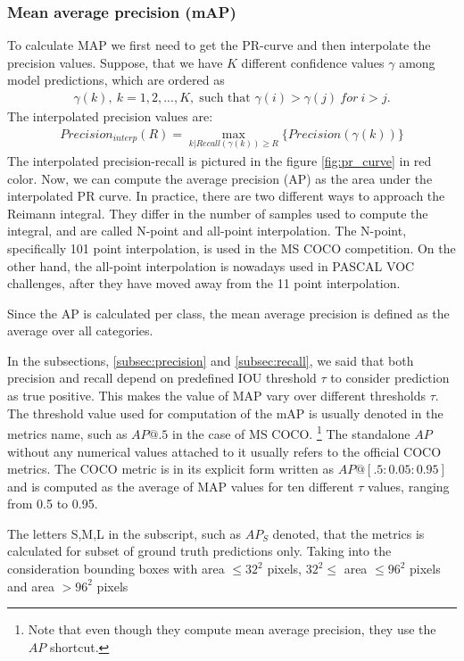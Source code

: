 \subsubsection{Mean average precision (mAP)}
To calculate MAP we first need to get the PR-curve and then interpolate the precision values. Suppose, that we have $K$ different confidence values $\gamma$ among model predictions, which are ordered as
\begin{align}
    \gamma(k),\: k = 1,2,...,K,  \; \text{such that } \gamma(i) > \gamma(j) \: for \: i > j.
\end{align}
The interpolated precision values are:
\begin{align}
    Precision_{interp}(R) = \max_{k|Recall(\gamma(k)) \geq R} \{  Precision(\gamma(k)) \}
\end{align}
The interpolated precision-recall is pictured in the figure \ref{fig:pr_curve} in red color. Now, we can compute the average precision (AP) as the area under the interpolated PR curve.
In practice, there are two different ways to approach the Reimann integral. They differ in the number of samples used to compute the integral, and are called N-point and all-point interpolation. The N-point, specifically 101 point interpolation, is used in the MS COCO competition. On the other hand, the all-point interpolation is nowadays used in PASCAL VOC challenges, after they have moved away from the 11 point interpolation.


Since the AP is calculated per class, the mean average precision is defined as the average over all categories.

In the subsections, \ref{subsec:precision} and \ref{subsec:recall}, we said that both precision and recall depend on predefined IOU threshold $\tau$ to consider prediction as true positive. This makes the value of MAP vary over different thresholds $\tau$. The threshold value used for computation of the mAP is usually denoted in the metrics name, such as $AP@.5$ in the case of MS COCO. \footnote{Note that even though they compute mean average precision, they use the $AP$ shortcut.} The standalone $AP$ without any numerical values attached to it usually refers to the official COCO metrics. The COCO metric is in its explicit form written as $AP@[.5:0.05:0.95]$ and is computed as the average of MAP values for ten different $\tau$ values, ranging from 0.5 to 0.95.

The letters S,M,L in the subscript, such as $AP_S$ denoted, that the metrics is calculated for subset of ground truth predictions only. Taking into the consideration bounding boxes with area $\leq 32^2$ pixels, $32^2 \le $ area $ \leq 96^2$ pixels and area $> 96^2$ pixels

